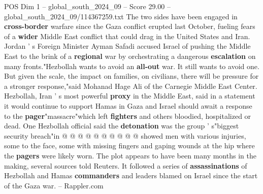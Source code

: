 \begin{textsample}{POS Dim 1 – global\_south\_2024\_09 – Score 29.00 – global\_south\_2024\_09/114367259.txt}
The two sides have been engaged in \textbf{cross-border} warfare since the Gaza conflict erupted last October, fueling fears of a \textbf{wider} Middle East conflict that could drag in the United States and Iran.
Jordan ' s Foreign Minister Ayman Safadi accused Israel of pushing the Middle East to the brink of a \textbf{regional} war by orchestrating a dangerous \textbf{escalation} on many fronts."Hezbollah wants to avoid an \textbf{all-out} war.
It still wants to avoid one.
But given the scale, the impact on families, on civilians, there will be pressure for a stronger response,"said Mohanad Hage Ali of the Carnegie Middle East Center.
Hezbollah, Iran ' s most powerful \textbf{proxy} in the Middle East, said in a statement it would continue to support Hamas in Gaza and Israel should await a response to the \textbf{pager}"massacre"which left \textbf{fighters} and others bloodied, hospitalized or dead.
One Hezbollah official said the \textbf{detonation} was the group ' s"biggest security breach"in @ @ @ @ @ @ @ @ @ @ showed men with various injuries, some to the face, some with missing fingers and gaping wounds at the hip where the \textbf{pagers} were likely worn.
The plot appears to have been many months in the making, several sources told Reuters.
It followed a series of \textbf{assassinations} of Hezbollah and Hamas \textbf{commanders} and leaders blamed on Israel since the start of the Gaza war. -- Rappler.com

\end{textsample}
